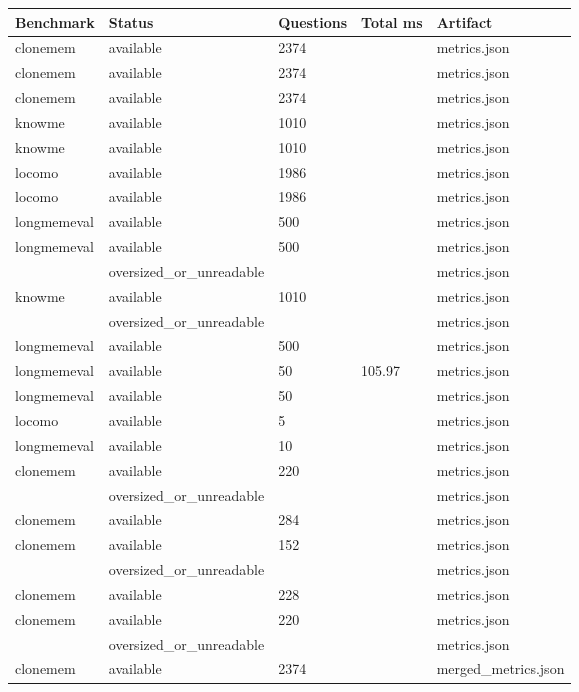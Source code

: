 \begin{tabular}{lllll}
\toprule
Benchmark & Status & Questions & Total ms & Artifact \\
\midrule
clonemem & available & 2374 &  & metrics.json \\
clonemem & available & 2374 &  & metrics.json \\
clonemem & available & 2374 &  & metrics.json \\
knowme & available & 1010 &  & metrics.json \\
knowme & available & 1010 &  & metrics.json \\
locomo & available & 1986 &  & metrics.json \\
locomo & available & 1986 &  & metrics.json \\
longmemeval & available & 500 &  & metrics.json \\
longmemeval & available & 500 &  & metrics.json \\
 & oversized_or_unreadable &  &  & metrics.json \\
knowme & available & 1010 &  & metrics.json \\
 & oversized_or_unreadable &  &  & metrics.json \\
longmemeval & available & 500 &  & metrics.json \\
longmemeval & available & 50 & 105.97 & metrics.json \\
longmemeval & available & 50 &  & metrics.json \\
locomo & available & 5 &  & metrics.json \\
longmemeval & available & 10 &  & metrics.json \\
clonemem & available & 220 &  & metrics.json \\
 & oversized_or_unreadable &  &  & metrics.json \\
clonemem & available & 284 &  & metrics.json \\
clonemem & available & 152 &  & metrics.json \\
 & oversized_or_unreadable &  &  & metrics.json \\
clonemem & available & 228 &  & metrics.json \\
clonemem & available & 220 &  & metrics.json \\
 & oversized_or_unreadable &  &  & metrics.json \\
clonemem & available & 2374 &  & merged_metrics.json \\

\end{tabular}
